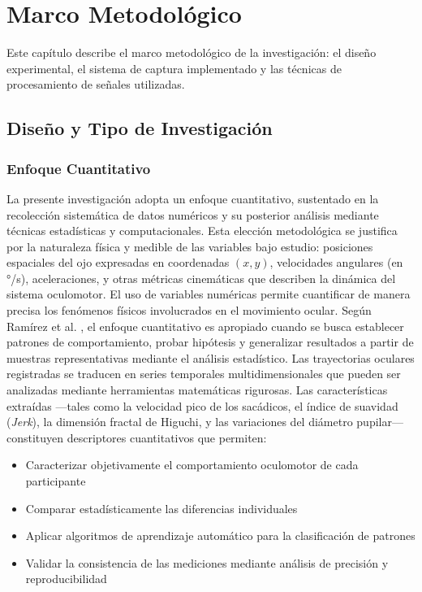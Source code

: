 \chapter{Marco Metodológico}

Este capítulo describe el marco metodológico de la investigación: el diseño experimental, el sistema de captura implementado y las técnicas de procesamiento de señales utilizadas.

\section{Diseño y Tipo de Investigación}

\subsection{Enfoque Cuantitativo}

La presente investigación adopta un enfoque cuantitativo, sustentado en la recolección sistemática de datos numéricos y su posterior análisis mediante técnicas estadísticas y computacionales.
Esta elección metodológica se justifica por la naturaleza física y medible de las variables bajo estudio: posiciones espaciales del ojo expresadas en coordenadas $(x, y)$, velocidades angulares (en °/s), aceleraciones, y otras métricas cinemáticas que describen la dinámica del sistema oculomotor.
El uso de variables numéricas permite cuantificar de manera precisa los fenómenos físicos involucrados en el movimiento ocular.
Según Ramírez et al. \cite{ramirez2004}, el enfoque cuantitativo es apropiado cuando se busca establecer patrones de comportamiento, probar hipótesis y generalizar resultados a partir de muestras representativas mediante el análisis estadístico.
Las trayectorias oculares registradas se traducen en series temporales multidimensionales que pueden ser analizadas mediante herramientas matemáticas rigurosas.
Las características extraídas —tales como la velocidad pico de los sacádicos, el índice de suavidad (\textit{Jerk}), la dimensión fractal de Higuchi, y las variaciones del diámetro pupilar— constituyen descriptores cuantitativos que permiten:

\begin{itemize}
	\item Caracterizar objetivamente el comportamiento oculomotor de cada participante
	\item Comparar estadísticamente las diferencias individuales
	\item Aplicar algoritmos de aprendizaje automático para la clasificación de patrones
	\item Validar la consistencia de las mediciones mediante análisis de precisión y reproducibilidad
\end{itemize}

